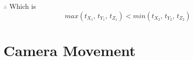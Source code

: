 $\therefore$ Which is
\begin{equation}\label{equ:ray-box-2d-intersection}
max(t_{X_1},\,t_{Y_1},\,t_{Z_1}) < min(t_{X_2},\,t_{Y_2},\,t_{Z_2})
\end{equation}

\section{Camera Movement}




